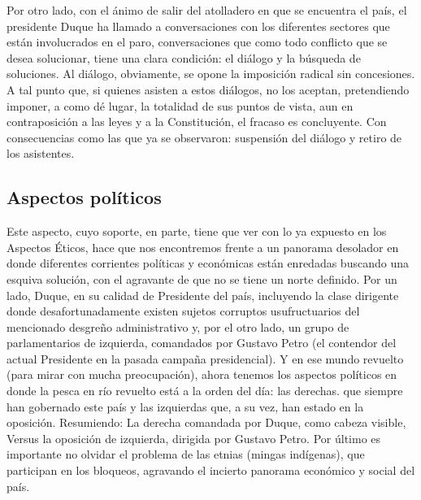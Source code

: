 \documentclass[doc, 12pt, letterpaper, donotrepeattitle, floatsintext, natbib]{apa7}
\begin{document}

Por otro lado, con el ánimo de salir del atolladero en que se encuentra el país, el presidente Duque ha llamado a conversaciones con los diferentes sectores que están involucrados en el paro, conversaciones que como todo conflicto que se desea solucionar, tiene una clara condición: el diálogo y la búsqueda de soluciones. Al diálogo, obviamente, se opone la imposición radical sin concesiones. A tal punto que, si quienes asisten a estos diálogos, no los aceptan, pretendiendo imponer, a como dé lugar, la totalidad de sus puntos de vista, aun en contraposición a las leyes y a la Constitución, el fracaso es concluyente. Con consecuencias como las que ya se observaron: suspensión del diálogo y retiro de los asistentes.

\subsection{Aspectos políticos}
Este aspecto, cuyo soporte, en parte, tiene que ver con lo ya expuesto en los Aspectos Éticos, hace que nos encontremos frente a un panorama desolador en donde diferentes corrientes políticas y económicas están enredadas buscando una esquiva solución, con el agravante de que no se tiene un norte definido. Por un lado, Duque, en su calidad de Presidente del país, incluyendo la clase dirigente donde desafortunadamente existen sujetos corruptos usufructuarios del mencionado desgreño administrativo y, por el otro lado, un grupo de parlamentarios de izquierda, comandados por Gustavo Petro (el contendor del actual Presidente en la pasada campaña presidencial). Y en ese mundo revuelto (para mirar con mucha preocupación), ahora tenemos los aspectos políticos en donde la pesca en río revuelto está a la orden del día: las derechas. que siempre han gobernado este país y las izquierdas que, a su vez, han estado en la oposición. Resumiendo: La derecha comandada por Duque, como cabeza visible, Versus la oposición de izquierda, dirigida por Gustavo Petro. Por último es importante no olvidar el problema de las etnias (mingas indígenas), que participan en los bloqueos, agravando el incierto panorama económico y social del país.
\end{document}
